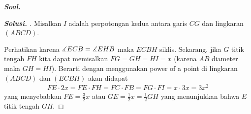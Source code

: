 \textbf{\textit{Soal. }}

\begin{proof}[\textbf{Solusi. }] Misalkan $I$ adalah perpotongan kedua antara garis $CG$ dan lingkaran $(ABCD)$.
    
    Perhatikan karena $\measuredangle ECB = \measuredangle EHB$ maka $ECBH$ siklis. Sekarang, jika $G$ titik tengah $FH$ kita dapat memisalkan $FG=GH=HI=x$ (karena $AB$ diameter maka $GH=HI$). Berarti dengan menggunakan power of a point di lingkaran $(ABCD)$ dan $(ECBH)$ akan didapat
    \begin{align*}
        FE \cdot 2x = FE \cdot FH = FC \cdot FB = FG \cdot FI = x \cdot 3x = 3x^2 
    \end{align*}
    yang menyebabkan $FE = \frac{3}{2}x$ atau $GE=\frac{1}{2}x=\frac{1}{2}GH$ yang menunjukkan bahwa $E$ titik tengah $GH$.
\end{proof}